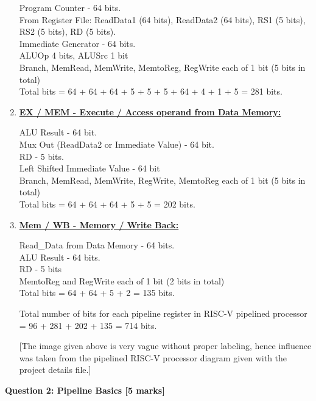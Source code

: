 \documentclass[addpoints]{exam}
\begin{document}
\begin{sloppypar}
\begin{questions}
\begin{solution}
\begin{enumerate}
            Program Counter - 64 bits. \\ From Register File: ReadData1 (64 bits), ReadData2 (64 bits), RS1 (5 bits), RS2 (5 bits), RD (5 bits). \\ Immediate Generator - 64 bits. \\ ALUOp 4 bits, ALUSrc 1 bit \\ Branch, MemRead, MemWrite, MemtoReg, RegWrite each of 1 bit (5 bits in total) \\ 
            Total bits = 64 + 64 + 64 + 5 + 5 + 5 + 64 + 4 + 1 + 5 = 281 bits.

            \item \textbf{\underline{EX / MEM - Execute / Access operand from Data Memory:}}
            
            ALU Result - 64 bit. \\ Mux Out (ReadData2 or Immediate Value) - 64 bit. \\ RD - 5 bits. \\ 
            Left Shifted Immediate Value - 64 bit \\
            Branch, MemRead, MemWrite, RegWrite, MemtoReg each of 1 bit (5 bits in total) \\ Total bits = 64 + 64 + 64 + 5 + 5 = 202 bits.

            \item \textbf{\underline{Mem / WB - Memory / Write Back:}}
            
            Read\_Data from Data Memory - 64 bits. \\ 
            ALU Result - 64 bits. \\ RD - 5 bits \\ MemtoReg and RegWrite each of 1 bit (2 bits in total) \\ 
            Total bits = 64 + 64 + 5 + 2 = 135 bits.

            Total number of bits for each pipeline register in RISC-V pipelined processor = 96 + 281 + 202 + 135 = 714 bits.

            [The image given above is very vague without proper labeling, hence influence was taken from the pipelined RISC-V processor diagram given with the project details file.]
        \end{enumerate}
    \end{solution}
    \newpage
    \question[5]
    \begin{center}
        \textbf{Question 2: Pipeline Basics [5 marks]}    
    \end{center}


\end{questions}
\end{sloppypar}
\end{document}
